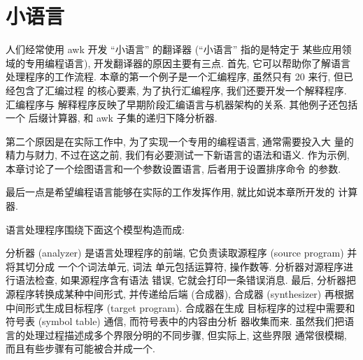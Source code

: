 \chapter{小语言}
\label{chap:little_languages}

人们经常使用 awk 开发 ``小语言'' 的翻译器 (``小语言'' 指的是特定于
某些应用领域的专用编程语言), 
开发翻译器的原因主要有三点. 首先, 它可以帮助你了解语言处理程序的工作流程.
本章的第一个例子是一个汇编程序, 虽然只有 20 来行, 但已经包含了汇编过程
的核心要素, 为了执行汇编程序, 我们还要开发一个解释程序. 汇编程序与
解释程序反映了早期阶段汇编语言与机器架构的关系. 其他例子还包括一个
后缀计算器, 和 awk 子集的递归下降分析器.

第二个原因是在实际工作中, 为了实现一个专用的编程语言, 通常需要投入大
量的精力与财力, 不过在这之前, 我们有必要测试一下新语言的语法和语义. 
作为示例, 本章讨论了一个绘图语言和一个参数设置语言, 后者用于设置排序命令
的参数.

最后一点是希望编程语言能够在实际的工作发挥作用, 就比如说本章所开发的
计算器.

语言处理程序围绕下面这个模型构造而成:
\begin{center}
\end{center}

分析器 (analyzer) 是语言处理程序的前端, 它负责读取源程序 (source program)
并将其切分成 一个个词法单元, 词法
单元包括运算符, 操作数等. 分析器对源程序进行语法检查, 如果源程序含有语法
错误, 它就会打印一条错误消息. 最后, 分析器把源程序转换成某种中间形式,
并传递给后端 (合成器), 合成器 (synthesizer) 再根据中间形式生成目标程序
(target program). 合成器在生成
目标程序的过程中需要和符号表 (symbol table) 通信, 而符号表中的内容由分析
器收集而来.
虽然我们把语言的处理过程描述成多个界限分明的不同步骤, 但实际上, 这些界限
通常很模糊, 而且有些步骤有可能被合并成一个.

